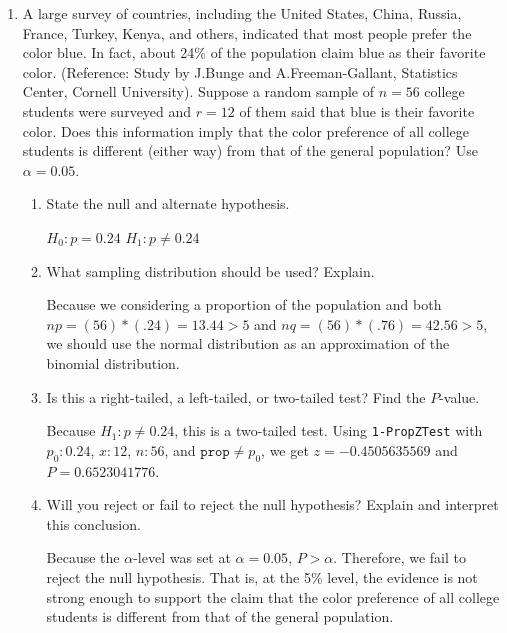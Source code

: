 \documentclass{article}
\newcommand{\answer}[1]{\color{red}#1}
\begin{document}
\begin{enumerate}
\item A large survey of countries, including the United States, China, Russia, France, Turkey, Kenya, and others, indicated that most people prefer the color blue. In fact, about 24\% of the population claim blue as their favorite color. (Reference: Study by J.Bunge and A.Freeman-Gallant, Statistics Center, Cornell University).  
Suppose a random sample of $n=56$ college students were surveyed and $r=12$ of them said that blue is their favorite color. Does this information imply that the color preference of all college students is different (either way) from that of the general population? Use $\alpha = 0.05$.
	\begin{enumerate}
	\item State the null and alternate hypothesis. 
	
	{\answer $H_0 : p = 0.24$ 
	$H_1: p \neq 0.24$} 
	
	
	\item What sampling distribution should be used? Explain. 
	
	{\answer Because we considering a proportion of the population and both $np = (56)*(.24) = 13.44 > 5$ and $nq = (56)*(.76) = 42.56 >5$, we should use the normal distribution as an approximation of the binomial distribution.} 
	
	\item Is this a right-tailed, a left-tailed, or two-tailed test? Find the $P$-value. 
	
	{\answer Because $H_1: p \neq 0.24$, this is a two-tailed test. 
	Using \texttt{1-PropZTest} with $p_0: 0.24$, $x: 12$, $n:56$, and $\texttt{prop} \neq p_0$, we get $z=-0.4505635569$ and $P = 0.6523041776$.} 
	 
	 
	\item Will you reject or fail to reject the null hypothesis? Explain and interpret this conclusion. 
	
	{\answer Because the $\alpha$-level was set at $\alpha = 0.05$, $P > \alpha$. Therefore, we fail to reject the null hypothesis. That is, at the 5\% level, the evidence is not strong enough to support the claim that the color preference of all college students is different from that of the general population.} 
	 
	\end{enumerate}

\newpage


\end{enumerate}
\end{document}
